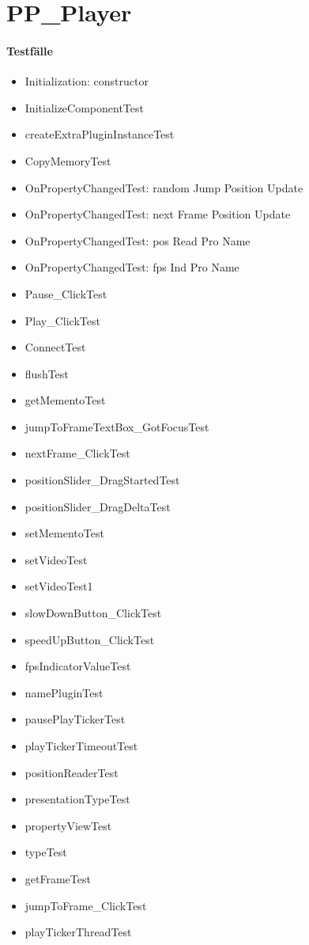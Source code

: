 \section{PP_Player}
\paragraph*{Testfälle}
\begin{itemize}
\item Initialization: constructor
\item InitializeComponentTest
\item createExtraPluginInstanceTest
\item CopyMemoryTest
\item OnPropertyChangedTest: random Jump Position Update
\item OnPropertyChangedTest: next Frame Position Update
\item OnPropertyChangedTest: pos Read Pro Name
\item OnPropertyChangedTest: fps Ind Pro Name
\item Pause_ClickTest
\item Play_ClickTest
\item ConnectTest
\item flushTest
\item getMementoTest
\item jumpToFrameTextBox_GotFocusTest
\item nextFrame_ClickTest
\item positionSlider_DragStartedTest
\item positionSlider_DragDeltaTest
\item setMementoTest
\item setVideoTest
\item setVideoTest1
\item slowDownButton_ClickTest
\item speedUpButton_ClickTest
\item fpsIndicatorValueTest
\item namePluginTest
\item pausePlayTickerTest
\item playTickerTimeoutTest
\item positionReaderTest
\item presentationTypeTest
\item propertyViewTest
\item typeTest
\item getFrameTest
\item jumpToFrame_ClickTest
\item playTickerThreadTest
\end{itemize}

